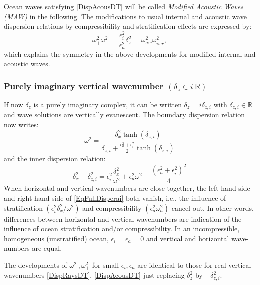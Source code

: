 \documentclass[a4paper,11pt]{article}
\begin{document}
Ocean waves satisfying \ref{DispAcousDT} will be called \textit{Modified Acoustic Waves (MAW)} in the following. The modifications to usual internal and acoustic wave dispersion relations by compressibility and stratification effects are expressed by:
\[
\omega_+^2\omega_-^2=\frac{\epsilon_i^2}{\epsilon_a^2}\delta_x^2=\omega_{aw}^2\omega_{iwr}^2,
\]
which explains the symmetry in the above developments for modified internal and acoustic waves.

\subsubsection{Purely imaginary vertical wavenumber $(\delta_z\in i\ 
\mathbb{R})$}
\label{subsubsectioniR}

If now $\delta_z$ is a purely imaginary complex, it can be written $\delta_z=i\delta_{z,i}$ with $\delta_{z,i}\in\mathbb{R}$ and wave solutions are vertically evanescent. The boundary dispersion relation now writes:
\begin{equation}
\label{EqFullDisperbi}
\omega^2=\frac{\delta_x^2\tanh(\delta_{z,i})}
{\delta_{z,i}+\frac{\epsilon_a^2+\epsilon_i^2}{2}\tanh(\delta_{z,i})}
\end{equation}
and the inner dispersion relation:
%
\begin{equation}
	\label{EqFullDisperai}
 		\delta_x^2-\delta_{z,i}^2 =\epsilon_i^2\frac{\delta_x^2}
 			{\omega^2}+\epsilon_a^2\omega^2-\frac{(\epsilon_a^2+\epsilon_i^2)^2}{4}
\end{equation}
%
When horizontal and vertical wavenumbers are close together, the left-hand side and  right-hand side of  \ref{EqFullDisperai} both vanish, i.e., the influence of stratification $(\epsilon_i^2\delta_x^2/\omega^2)$ and compressibility $(\epsilon_a^2\omega_a^2)$ cancel out. In other words, differences between horizontal and vertical wavenumbers are indication of the influence of ocean stratification and/or compressibility. In an incompressible, homogeneous (unstratified) ocean, $\epsilon_i=\epsilon_a=0$ and vertical and horizontal wave-numbers are equal.

The developments of $\omega_-^2, \omega_+^2$ for small $\epsilon_i, \epsilon_a$ are identical to those for real vertical wavenumbers \ref{DispRaysDT}, \ref{DispAcousDT} just replacing $\delta_z^2$ by $-\delta_{z,i}^2$.
\end{document}

